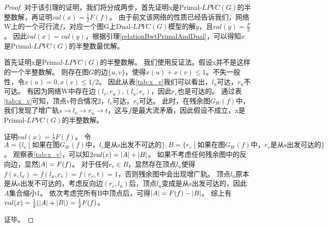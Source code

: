 \begin{proof}
对于该引理的证明，我们将分成两步，首先证明x是Primal-$LPVC(G)$的半整数解，再证明$val(x) = \frac{1}{2}F(f)$。
由于前文该网络的性质已经告诉我们，网络W上的一个可行流$f$，对应一个图G上Dual-$LPVC(G)$模型的解$y$，且$val(y) = \frac{F}{2}$。
因此$val(x) = val(y)$，根据引理\ref{relationBwtPrimalAndDual}，可以得知$x$是Primal-$LPVC(G)$的半整数最优解。

首先证明x是Primal-$LPVC(G)$的半整数解。
我们使用反证法。假设x并不是这样的一个半整数解。
则存在图$G$的边$\{u, v\}$，使得$x(u) + x(v) \le 1$。不失一般性，令$x(u) = 0, x(v) \le 1/2$。 
因此从表\ref{tab:x_v}我们可以看出，$l_u$可达，$r_u$不可达。
有因为网络W中存在边$(l_v, r_u), (l_u, r_v)$，因此$r_v$也是可达的。
通过表\ref{tab:x_v}可知，顶点v符合情况2，$l_v$可达，$r_v$可达。
此时，在残余图$G_W(f)$中，我们发现了增广轨$s \rightarrow l_v \rightarrow r_u \rightarrow t$，这与$f$是最大流矛盾，因此假设不成立，x是Primal-$LPVC(G)$的半整数解。

证明$val(x) = \frac{1}{2}F(f)$。
令$A = \{l_v\;|\;\text{如果在图$G_W(f)$中，$l_v$是从s出发不可达的}\}, B = \{r_v\;|\;\text{如果在图$G_W(f)$中，$r_v$是从s出发可达的}\}$。
观察表\ref{tab:x_v}，可以知$2val(x) = \left\vert A \right\vert + \left\vert B \right\vert$。
如果不考虑任何残余图中的反向边，显然$\left\vert A \right\vert = F(f)$。
对于任何$r_v \in B$，显然存在顶点$l_u$使得$f(s, l_u) = f(l_u, r_v) = f(r_v, t) = 1$，否则残余图中会出现增广轨。
顶点$l_u$原本是从s出发不可达的，考虑反向边$(r_v, l_u)$后，顶点$l_u$变成是从s出发可达的，因此$A$集合缩小1。
依次考虑完所有B中顶点后，可得$\left\vert A \right\vert = F(f) - \left\vert B \right\vert$。
综上有$val(x) = \frac{1}{2}(\left\vert A \right\vert + \left\vert B \right\vert) = \frac{1}{2}F(f)$。

证毕。
\end{proof}


